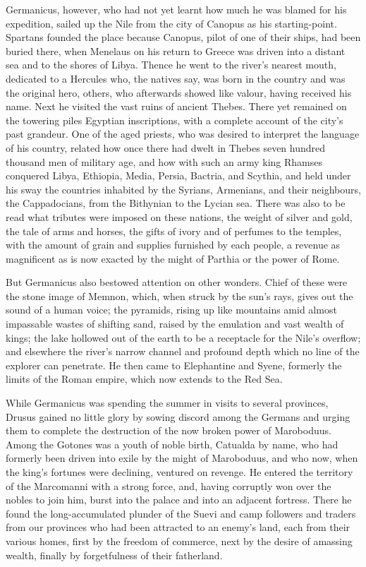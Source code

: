 Germanicus, however, who had not yet learnt how much he was blamed for his expedition, sailed up the Nile from the city of Canopus as his starting-point. Spartans founded the place because Canopus, pilot of one of their ships, had been buried there, when Menelaus on his return to Greece was driven into a distant sea and to the shores of Libya. Thence he went to the river's nearest mouth, dedicated to a Hercules who, the natives say, was born in the country and was the original hero, others, who afterwards showed like valour, having received his name. Next he visited the vast ruins of ancient Thebes. There yet remained on the towering piles Egyptian inscriptions, with a complete account of the city's past grandeur. One of the aged priests, who was desired to interpret the language of his country, related how once there had dwelt in Thebes seven hundred thousand men of military age, and how with such an army king Rhamses conquered Libya, Ethiopia, Media, Persia, Bactria, and Scythia, and held under his sway the countries inhabited by the Syrians, Armenians, and their neighbours, the Cappadocians, from the Bithynian to the Lycian sea. There was also to be read what tributes were imposed on these nations, the weight of silver and gold, the tale of arms and horses, the gifts of ivory and of perfumes to the temples, with the amount of grain and supplies furnished by each people, a revenue as magnificent as is now exacted by the might of Parthia or the power of Rome.


But Germanicus also bestowed attention on other wonders. Chief of these were the stone image of Memnon, which, when struck by the sun's rays, gives out the sound of a human voice; the pyramids, rising up like mountains amid almost impassable wastes of shifting sand, raised by the emulation and vast wealth of kings; the lake hollowed out of the earth to be a receptacle for the Nile's overflow; and elsewhere the river's narrow channel and profound depth which no line of the explorer can penetrate. He then came to Elephantine and Syene, formerly the limits of the Roman empire, which now extends to the Red Sea.


While Germanicus was spending the summer in visits to several provinces, Drusus gained no little glory by sowing discord among the Germans and urging them to complete the destruction of the now broken power of Maroboduus. Among the Gotones was a youth of noble birth, Catualda by name, who had formerly been driven into exile by the might of Maroboduus, and who now, when the king's fortunes were declining, ventured on revenge. He entered the territory of the Marcomanni with a strong force, and, having corruptly won over the nobles to join him, burst into the palace and into an adjacent fortress. There he found the long-accumulated plunder of the Suevi and camp followers and traders from our provinces who had been attracted to an enemy's land, each from their various homes, first by the freedom of commerce, next by the desire of amassing wealth, finally by forgetfulness of their fatherland.

